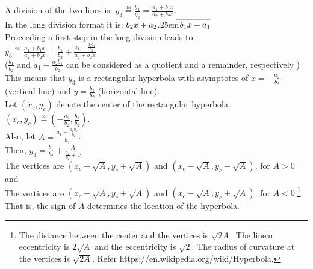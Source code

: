 \documentclass[11pt, a4paper]{article}
\newcommand\LongDiv[2]{%
	$\strut#1$\kern.25em\smash{\raise.3ex\hbox{$\big)$}}$\mkern-8mu
	\overline{\enspace\strut#2}$}
\begin{document}
\noindent
A division of the two lines is: $y_3 \overset{\underset{\mathrm{def}}{}}{=} \frac{y_1}{y_2}=\frac{a_1+b_1x}{a_2+b_2x}$.\\

\noindent
In the long division format it is: \LongDiv{b_2x+a_2}{b_1x+a_1}\\

\noindent
Proceeding a first step in the long division leads to:\\
$y_3 \overset{\underset{\mathrm{def}}{}}{=} \frac{a_1+b_1x}{a_2+b_2x}=\frac{b_1}{b_2}+\frac{a_1-\frac{a_2 b_1}{b_2}}{a_2+b_2x}$\\
($\frac{b_1}{b_2}$ and $a_1{\scriptstyle -}\frac{a_2 b_1}{b_2}$ can be considered as a quotient and a remainder, respectively )\\

\noindent
This means that $y_3$ is a rectangular hyperbola with asymptotes of $x=-\frac{a_2}{b_2}$ (vertical line) and $y=\frac{b_1}{b_2}$ (horizontal line). \\

\noindent
Let $(x_c, y_c)$ denote the center of the rectangular hyperbola. \\
$(x_c, y_c) \overset{\underset{\mathrm{def}}{}}{=} (-\frac{a_2}{b_2}, \frac{b_1}{b_2})$.\\

\noindent
Also, let $A = \frac{a_1-\frac{a_2 b_1}{b_2}}{b_2}$. \\
Then, $y_3= \frac{b_1}{b_2}+\frac{A}{\frac{a_2}{b_2}+x}$\\

\noindent
The vertices are $(x_c+\sqrt{A}, y_c+\sqrt{A})$ and $(x_c-\sqrt{A}, y_c-\sqrt{A})$. for $A>0$ and\\
The vertices are $(x_c-\sqrt{A}, y_c+\sqrt{A})$ and $(x_c-\sqrt{A}, y_c+\sqrt{A})$. for $A<0$.\footnote{The distance between the center and the vertices is $\sqrt{2A}$. The linear eccentricity is $2\sqrt{A}$ and the eccentricity is $\sqrt{2}$. The radius of curvature at the vertices is $\sqrt{2A}$. Refer https://en.wikipedia.org/wiki/Hyperbola.}\\
That is, the sign of $A$ determines the location of the hyperbola.

\end{document}
